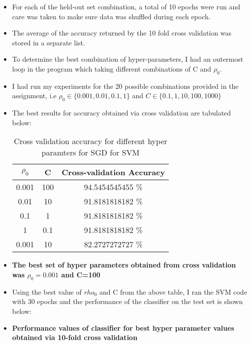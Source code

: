 \documentclass[11pt]{article}
\begin{document}
\begin{itemize}
\item For each of the held-out set combination, a total of 10 epochs were run and care was taken to make sure data was shuffled during each epoch.

\item The average of the accuracy returned by the 10 fold cross validation was stored in a separate list.

\item To determine the best combination of hyper-parameters, I had an outermost loop in the program which taking different combinations of C and $\rho_0$.

\item I had run my experiments for the 20 possible combinations provided in the assignment, i.e  $\rho_0 \in \{0.001, 0.01, 0.1, 1\}$ and
$C \in \{0.1, 1, 10, 100, 1000\}$


\item The best results for accuracy obtained via cross validation are tabulated below:

\begin{table}[h]
	\centering
	\begin{tabular}{|c|c| c|}
		\hline
		\textbf{$\rho_0$}  & \textbf{C} & \textbf{Cross-validation Accuracy} \\
		\hline
		  0.001 & 100 & 94.5454545455 \% \\
		\hline
		  0.01 & 10 & 91.8181818182 \% \\
		  \hline
		  0.1 & 1 & 91.8181818182 \% \\
		    \hline
		  1 & 0.1 & 91.8181818182 \% \\
		      \hline
		  0.001& 10 & 82.2727272727 \% \\
		   \hline   
	 \end{tabular}
	\caption{Cross validation accuracy for different hyper paramters for SGD for SVM}
	\label{t2}
\end{table}

\item \textbf{ The best set of hyper parameters obtained from cross validation was $\rho_0=0.001$ and C=100}

\item Using the best value of  $rho_0$ and C from the above table, I ran the SVM code with 30 epochs and the performance of the classifier on the test set is shown below:



\item 
\textbf{Performance values of classifier for best hyper parameter values obtained via 10-fold cross validation}


\end{itemize}
\end{document}
